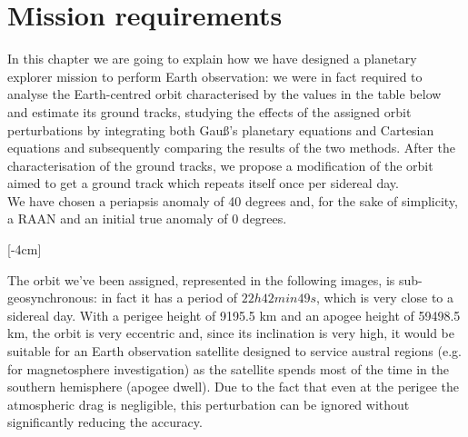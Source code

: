 \documentclass[11pt,a4paper]{report}
\begin{document}
\section{Mission requirements}
In this chapter we are going to explain how we have designed a planetary explorer
mission to perform Earth observation: we were in fact required to analyse the Earth-centred orbit characterised by the values in the table below and estimate its ground tracks, studying the effects of the assigned orbit perturbations by integrating both Gauß’s planetary equations and Cartesian equations and subsequently comparing the results of the two methods. After the characterisation of the ground tracks, we propose a modification of the orbit aimed to get a ground track which repeats itself once per sidereal day.\\
We have chosen a periapsis anomaly of 40 degrees and, for the sake of simplicity, a RAAN and an initial true anomaly of 0 degrees.

\begin{table}[H]
\centering
{}
\caption{Mission requirements}
\label{tab:Mission_requirements}
\end{table}

[-4cm]

The orbit we've been assigned, represented in the following images, is sub-geosynchronous: in fact it has a period of $22h 42 min 49s$, which is very close to a sidereal day. With a perigee height of 9195.5 km and an apogee height of 59498.5 km, the orbit is very eccentric and, since its inclination is very high, it would be suitable for an Earth observation satellite designed to service austral regions (e.g. for magnetosphere investigation) as the satellite spends most of the time in the southern hemisphere (apogee dwell).  
Due to the fact that even at the perigee the atmospheric drag is negligible, this perturbation can be ignored without significantly reducing the accuracy.
\end{document}
